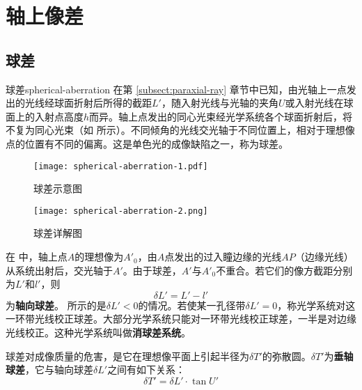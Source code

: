 \documentclass[cn,10pt,chinesefont=founder,math=mtpro2,cite=super,toc=onecol,twoside,openany]{elegantbook}
\begin{document}
\section{轴上像差}
\subsection{球差}
\begin{definition}{球差}{spherical-aberration}
在第 \ref{subsect:paraxial-ray} 章节中已知，由光轴上一点发出的光线经球面折射后所得的截距$L'$，随入射光线与光轴的夹角$U$或入射光线在球面上的入射点高度$h$而异。轴上点发出的同心光束经光学系统各个球面折射后，将不复为同心光束（如 所示）。不同倾角的光线交光轴于不同位置上，相对于理想像点的位置有不同的偏离。这是单色光的成像缺陷之一，称为球差。
\end{definition}

\begin{figure}[htbp]
	\centering
	\begin{minipage}[t]{0.3\textwidth}
		\centering
		\texttt{[image: spherical-aberration-1.pdf]}
		\caption{球差示意图}
		\label{fig:spherical-aberration-1}
	\end{minipage}
	\quad
	\begin{minipage}[t]{0.65\textwidth}
		\centering
		\texttt{[image: spherical-aberration-2.png]}
		\caption{球差详解图}
		\label{fig:spherical-aberration-2}
	\end{minipage}
\end{figure}

在 中，轴上点$A$的理想像为$A'_0$，由$A$点发出的过入瞳边缘的光线$AP$（边缘光线）从系统出射后，交光轴于$A'$。由于球差，$A'$与$A'_0$不重合。若它们的像方截距分别为$L'$和$l'$，则
\begin{equation}
\delta L'=L'-l'
\label{eq:spherical-aberration}
\end{equation}
为\textbf{轴向球差}。 所示的是$\delta L'<0$的情况。若使某一孔径带$\delta L'=0$，称光学系统对这一环带光线校正球差。大部分光学系统只能对一环带光线校正球差，一半是对边缘光线校正。这种光学系统叫做\textbf{消球差系统}。

球差对成像质量的危害，是它在理想像平面上引起半径为$\delta T'$的弥散圆。$\delta T'$为\textbf{垂轴球差}，它与轴向球差$\delta L'$之间有如下关系：
\begin{equation}
\delta T'=\delta L'\cdot\tan U'
\label{eq:spherical-aberration-relationship}
\end{equation}
\end{document}
